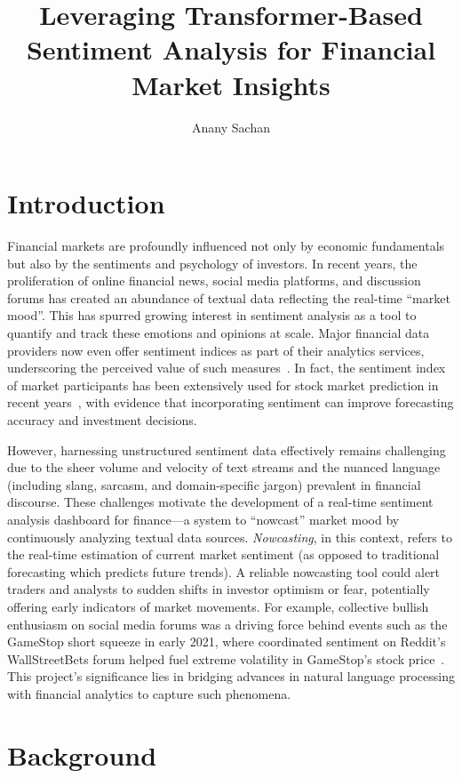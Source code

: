 \documentclass[12pt]{article}
\title{\textbf{Leveraging Transformer-Based Sentiment Analysis for Financial Market Insights}}
\author{Anany Sachan}
\begin{document}
\maketitle

\section{Introduction}
Financial markets are profoundly influenced not only by economic fundamentals but also by the sentiments and
psychology of investors. In recent years, the proliferation of online financial news, social media platforms,
and discussion forums has created an abundance of textual data reflecting the real-time ``market mood''. This
has spurred growing interest in sentiment analysis as a tool to quantify and track these emotions and
opinions at scale. Major financial data providers now even offer sentiment indices as part of their
analytics services, underscoring the perceived value of such measures~\cite{10.1109/MCI.2018.2866727}. In
fact, the sentiment index of market participants has been extensively used for stock market prediction in
recent years~\cite{10.1109/MCI.2018.2866727}, with evidence that incorporating sentiment can improve
forecasting accuracy and investment decisions.

However, harnessing unstructured sentiment data effectively remains challenging due to the sheer volume and
velocity of text streams and the nuanced language (including slang, sarcasm, and domain-specific jargon)
prevalent in financial discourse. These challenges motivate the development of a real-time sentiment analysis
dashboard for finance---a system to ``nowcast'' market mood by continuously analyzing textual data sources.
\textit{Nowcasting}, in this context, refers to the real-time estimation of current market sentiment (as
opposed to traditional forecasting which predicts future trends). A reliable nowcasting tool could alert
traders and analysts to sudden shifts in investor optimism or fear, potentially offering early indicators of
market movements. For example, collective bullish enthusiasm on social media forums was a driving force
behind events such as the GameStop short squeeze in early 2021, where coordinated sentiment on Reddit's
WallStreetBets forum helped fuel extreme volatility in GameStop's stock price~\cite{Desiderio_2025}. This
project's significance lies in bridging advances in natural language processing with financial analytics to
capture such phenomena.

\section{Background}
\end{document}
